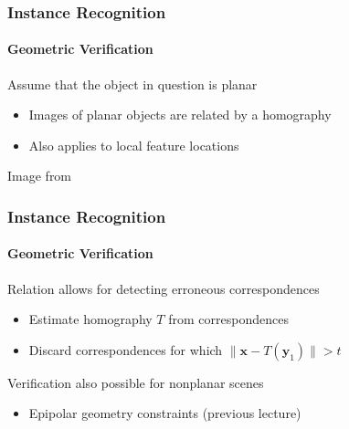 \documentclass[xetex,professionalfont]{beamer}
\renewcommand{\vec}[1]{\ensuremath{\mathbf{#1}}}
\newcommand{\vx}{\vec{x}}
\newcommand{\vy}{\vec{y}}
\begin{document}

\begin{frame}
\frametitle{Instance Recognition}
\framesubtitle{Geometric Verification}

Assume that the object in question is planar
\begin{itemize}
    \item Images of planar objects are related by a homography %
    \item Also applies to local feature locations
\end{itemize}

\smallskip
\begin{center}
    {\centering Image from \cite{prince12}}
\end{center}

\end{frame}


\begin{frame}
\frametitle{Instance Recognition}
\framesubtitle{Geometric Verification}

Relation allows for detecting erroneous correspondences
\begin{itemize}
    \item Estimate homography $T$ from correspondences %
    \item Discard correspondences for which $\lVert\vx-T(\vy_1)\rVert>t$ %
\end{itemize}

\bigskip
Verification also possible for nonplanar scenes
\begin{itemize}
    \item Epipolar geometry constraints (previous lecture) %
\end{itemize}

\end{frame}
\end{document}

